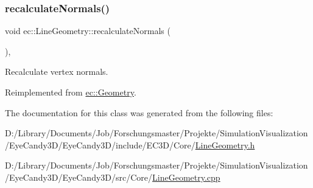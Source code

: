 \mbox{\label{classec_1_1_line_geometry_a7a0b22930aa566c97d5f86f2a8246696}} 
\subsubsection{\texorpdfstring{recalculate\+Normals()}{recalculateNormals()}}
{\footnotesize\ttfamily void ec\+::\+Line\+Geometry\+::recalculate\+Normals (\begin{DoxyParamCaption}{ }\end{DoxyParamCaption})\hspace{0.3cm}{\ttfamily [override]}, {\ttfamily [virtual]}}



Recalculate vertex normals. 



Reimplemented from \mbox{\hyperlink{classec_1_1_geometry_a228d4a0fa01a17379f24aee2c769b501}{ec\+::\+Geometry}}.



The documentation for this class was generated from the following files\+:\begin{DoxyCompactItemize}
\item 
D\+:/\+Library/\+Documents/\+Job/\+Forschungsmaster/\+Projekte/\+Simulation\+Visualization/\+Eye\+Candy3\+D/\+Eye\+Candy3\+D/include/\+E\+C3\+D/\+Core/\mbox{\hyperlink{_line_geometry_8h}{Line\+Geometry.\+h}}\item 
D\+:/\+Library/\+Documents/\+Job/\+Forschungsmaster/\+Projekte/\+Simulation\+Visualization/\+Eye\+Candy3\+D/\+Eye\+Candy3\+D/src/\+Core/\mbox{\hyperlink{_line_geometry_8cpp}{Line\+Geometry.\+cpp}}\end{DoxyCompactItemize}
